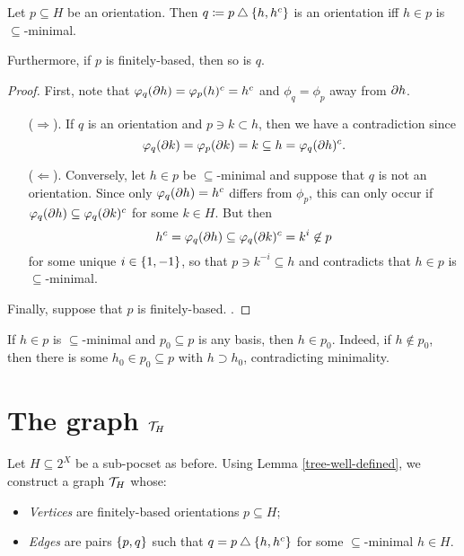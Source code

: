 \documentclass{amsart}
\begin{document}
    \begin{lemma}\label{tree-well-defined}
        Let $p\subseteq H$ be an orientation. Then $q\coloneqq p\bigtriangleup\left\{h,h^c\right\}$ is an orientation iff $h\in p$ is $\subseteq$-minimal.

        Furthermore, if $p$ is finitely-based, then so is $q$.
    \end{lemma}
    \begin{proof}
        First, note that $\varphi_q(\partial h)=\varphi_p(h)^c=h^c$ and $\phi_q=\phi_p$ away from $\partial h$.
        \begin{itemize}
            \item[($\Rightarrow$).] If $q$ is an orientation and $p\ni k\subset h$, then we have a contradiction since
                \begin{equation*}
                    \varphi_q(\partial k)=\varphi_p(\partial k)=k\subseteq h=\varphi_q(\partial h)^c.
                \end{equation*}
            \item[($\Leftarrow$).]Conversely, let $h\in p$ be $\subseteq$-minimal and suppose that $q$ is not an orientation. Since only $\varphi_q(\partial h)=h^c$ differs from $\phi_p$, this can only occur if $\varphi_q(\partial h)\subseteq\varphi_q(\partial k)^c$ for some $k\in H$. But then
                \begin{equation*}
                    h^c=\varphi_q(\partial h)\subseteq\varphi_q(\partial k)^c=k^i\not\in p
                \end{equation*}
                for some unique $i\in\left\{1,-1\right\}$, so that $p\ni k^{-i}\subseteq h$ and contradicts that $h\in p$ is $\subseteq$-minimal.
        \end{itemize}
        Finally, suppose that $p$ is finitely-based. {\color{red}{???}}.
    \end{proof}

    \begin{remark}
        If $h\in p$ is $\subseteq$-minimal and $p_0\subseteq p$ is any basis, then $h\in p_0$. Indeed, if $h\not\in p_0$, then there is some $h_0\in p_0\subseteq p$ with $h\supset h_0$, contradicting minimality.
    \end{remark}

    \section{The graph $\mathcal{T}_H$}

    Let $H\subseteq2^X$ be a sub-pocset as before. Using Lemma \ref{tree-well-defined}, we construct a graph $\mathcal{T}_H$ whose:
    \begin{itemize}
        \item \textit{Vertices} are finitely-based orientations $p\subseteq H$;
        \item \textit{Edges} are pairs $\left\{p,q\right\}$ such that $q=p\bigtriangleup\left\{h,h^c\right\}$ for some $\subseteq$-minimal $h\in H$.
    \end{itemize}
\end{document}
